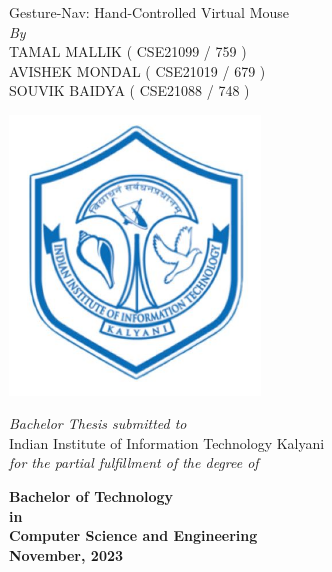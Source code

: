 \documentclass[12pt,a4paper]{report}
\newcommand{\mySpace}{0.6cm}
\begin{document}
\clearpage
	\begin{titlepage}

    \centering
    {\Huge Gesture-Nav: Hand-Controlled Virtual Mouse \fontsize{24}{28.8}\selectfont {}\selectfont}\\
\vspace{\mySpace}
    \large \textit{By}\\
\vspace{\mySpace}
    {\Large TAMAL MALLIK ( CSE21099 / 759 ) \\
    \vspace{0.1cm}
    AVISHEK MONDAL ( CSE21019 / 679 ) \\
    \vspace{0.1cm}
    SOUVIK BAIDYA ( CSE21088  / 748 ) \\
    \fontsize{18}{22}\selectfont {}\selectfont
\vspace{\mySpace}}
    \begin{center}
        \includegraphics[width=0.5\textwidth]{iiitk_logo} %
    \end{center}
    {\Large \textit{Bachelor Thesis submitted to}\\
    \vspace{\mySpace}
    Indian Institute of Information Technology Kalyani \\ \vspace{\mySpace}
	 \textit{for the partial fulfillment of the degree of}\\ \vspace{\mySpace}

{\bfseries %
	 Bachelor of Technology \\
	 in \\
	 Computer Science and Engineering\\
\vspace{\mySpace}
	  November, 2023 \fontsize{18}{22}}\selectfont {}\selectfont}
    \vspace*{\fill}
\end{titlepage}
\restoregeometry
\end{document}
